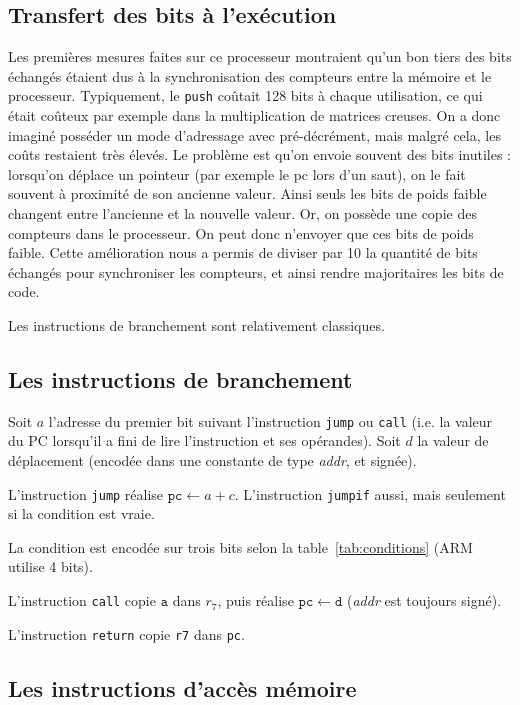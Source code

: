 \documentclass[architecture]{compas2018}
\begin{document}
\subsection{Transfert des bits à l'exécution}

Les premières mesures faites sur ce processeur montraient qu'un bon tiers des bits échangés étaient dus à la synchronisation des compteurs entre la mémoire et le processeur. Typiquement, le \texttt{push} coûtait 128 bits à chaque utilisation, ce qui était coûteux par exemple dans la multiplication de matrices creuses. On a donc imaginé posséder un mode d'adressage avec pré-décrément, mais malgré cela, les coûts restaient très élevés. Le problème est qu'on envoie souvent des bits inutiles : lorsqu'on déplace un pointeur (par exemple le pc lors d'un saut), on le fait souvent à proximité de son ancienne valeur. Ainsi seuls les bits de poids faible changent entre l'ancienne et la nouvelle valeur. Or, on possède une copie des compteurs dans le processeur. On peut donc n'envoyer que ces bits de poids faible. Cette amélioration nous a permis de diviser par 10 la quantité de bits échangés pour synchroniser les compteurs, et ainsi rendre majoritaires les bits de code.

%
\iffalse
Les instructions de branchement sont relativement classiques.
\subsection{Les instructions de branchement }
\label{sec:jumpcallret}

Soit $a$ l'adresse du premier bit suivant l'instruction \texttt{jump} ou \texttt{call} (i.e. la valeur du PC lorsqu'il a fini de lire l'instruction et ses opérandes).
Soit $d$ la valeur de déplacement (encodée dans une constante de type \textit{addr}, et signée).

L'instruction \texttt{jump} réalise $\mathtt{pc}\leftarrow a + c$.
L'instruction \texttt{jumpif} aussi, mais seulement si la condition est vraie.

La condition  est encodée sur trois bits  selon la table~\ref{tab:conditions} (ARM utilise 4 bits).

L'instruction \texttt{call} copie $\texttt{a}$ dans $r_{7}$, puis réalise $\mathtt{pc} \leftarrow \texttt{d}$
(\emph{addr} est toujours signé).

L'instruction \texttt{return} copie \texttt{r7} dans \texttt{pc}.


\subsection{Les instructions d'accès mémoire}
\label{sec:mem}
\end{document}
